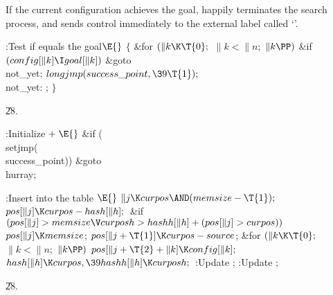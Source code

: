 If the current configuration achieves the goal,  happily terminates
the search process, and sends control immediately to the external label
called `'.

\Y\B\4:Test if  equals the goal\X${}\E{}$\6
${}\{{}$\1\6
\&{for} ${}(\|k\K\T{0};{}$ ${}\|k<\|n;{}$ ${}\|k\PP){}$\1\6
\&{if} ${}(\\{config}[\|k]\I\\{goal}[\|k]){}$\1\5
\&{goto} \\{not\_yet};\2\2\6
${}\\{longjmp}(\\{success\_point},\39\T{1});{}$\6
\4\\{not\_yet}:\5
;\6
\4${}\}{}$\2\par
\U28.\fi

\B{}:Initialize\X${}\mathrel+\E{}$\6
\&{if} (\\{setjmp}(\\{success\_point}))\1\5
\&{goto} \\{hurray};\2\par
\fi

\B{}:Insert  into the  table%
\X${}\E{}$\6
$\|j\K\\{curpos}\AND(\\{memsize}-\T{1});{}$\6
${}\\{pos}[\|j]\K\\{curpos}-\\{hash}[\|h];{}$\6
\&{if} ${}(\\{pos}[\|j]>\\{memsize}\V\\{curposh}>\\{hashh}[\|h]+(\\{pos}[\|j]>%
\\{curpos})){}$\1\5
${}\\{pos}[\|j]\K\\{memsize}{}$;\2\6
${}\\{pos}[\|j+\T{1}]\K\\{curpos}-\\{source}{}$;\6
\&{for} ${}(\|k\K\T{0};{}$ ${}\|k<\|n;{}$ ${}\|k\PP){}$\1\5
${}\\{pos}[\|j+\T{2}+\|k]\K\\{config}[\|k];{}$\2\6
${}\\{hash}[\|h]\K\\{curpos},\39\\{hashh}[\|h]\K\\{curposh};{}$\6
:Update \X;\6
:Update \X;\par
\U28.\fi

